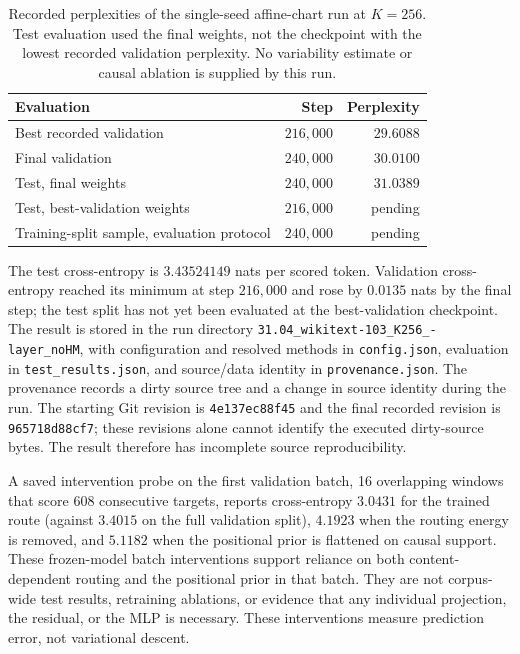 \documentclass[twoside,11pt]{article}
\begin{document}
\begin{table}[htbp]
\centering
\begin{tabular}{lrr}
\toprule
Evaluation & Step & Perplexity \\
\midrule
Best recorded validation & $216{,}000$ & $29.6088$ \\
Final validation & $240{,}000$ & $30.0100$ \\
Test, final weights & $240{,}000$ & $31.0389$ \\
Test, best-validation weights & $216{,}000$ & pending \\ %
Training-split sample, evaluation protocol & $240{,}000$ & pending \\ %
\bottomrule
\end{tabular}
\caption{Recorded perplexities of the single-seed affine-chart run at $K=256$. Test evaluation used the final weights, not the checkpoint with the lowest recorded validation perplexity. No variability estimate or causal ablation is supplied by this run.}
\label{tab:relational_run}
\end{table}

The test cross-entropy is $3.43524149$ nats per scored token. Validation cross-entropy reached its minimum at step $216{,}000$ and rose by $0.0135$ nats by the final step; the test split has not yet been evaluated at the best-validation checkpoint. The result is stored in the run directory \texttt{31.04\_\allowbreak wikitext-103\_\allowbreak K256\_-layer\_\allowbreak noHM}, with configuration and resolved methods in \texttt{config.json}, evaluation in \texttt{test\_\allowbreak results.json}, and source/data identity in \texttt{provenance.json}. The provenance records a dirty source tree and a change in source identity during the run. The starting Git revision is \texttt{4e137ec88f45} and the final recorded revision is \texttt{965718d88cf7}; these revisions alone cannot identify the executed dirty-source bytes. The result therefore has incomplete source reproducibility.

A saved intervention probe on the first validation batch, 16 overlapping windows that score 608 consecutive targets, reports cross-entropy $3.0431$ for the trained route (against $3.4015$ on the full validation split), $4.1923$ when the routing energy is removed, and $5.1182$ when the positional prior is flattened on causal support. These frozen-model batch interventions support reliance on both content-dependent routing and the positional prior in that batch. They are not corpus-wide test results, retraining ablations, or evidence that any individual projection, the residual, or the MLP is necessary. These interventions measure prediction error, not variational descent.
\end{document}
